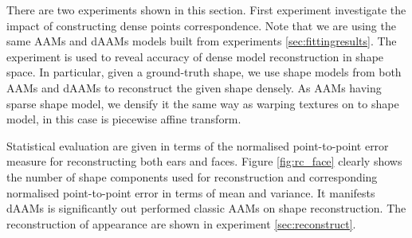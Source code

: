 There are two experiments shown in this section. First experiment investigate the impact of constructing dense points correspondence. Note that we are using the same AAMs and dAAMs models built from experiments \ref{sec:fittingresults}. The experiment is used to reveal accuracy of dense model reconstruction in shape space. In particular, given a ground-truth shape, we use shape models from both AAMs and dAAMs to reconstruct the given shape densely. As AAMs having sparse shape model, we densify it the same way as warping textures on to shape model, in this case is piecewise affine transform. 

Statistical evaluation are given in terms of the normalised point-to-point error
measure for reconstructing both ears and faces. Figure \ref{fig:rc_face} clearly shows the number of shape components used for reconstruction and corresponding normalised point-to-point error in terms of mean and variance. It manifests dAAMs is significantly out performed classic AAMs on shape reconstruction. The reconstruction of appearance are shown in experiment \ref{sec:reconstruct}.

